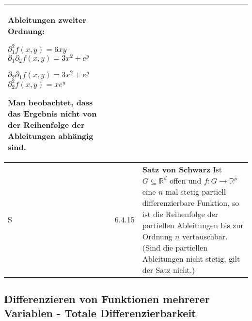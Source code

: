 \begin{longtable}{p{0.75cm} p{1cm} p{16cm}}
                        Ableitungen zweiter Ordnung: \hfill \break
                        \centerline{$\partial_1^2 f(x,y) =6xy$ \hspace{1cm} $\partial_1 \partial_2f(x,y) = 3x^2 + e^y $}
                        \centerline{$ \partial_2 \partial_1 f(x,y) = 3x^2 + e^y$ \hspace{1cm} $\partial_2^2f(x,y) = xe^y$} 
                        Man beobachtet, dass das Ergebnis nicht von der Reihenfolge der Ableitungen abhängig sind. \\
        \midrule
        S   & 6.4.15&   \textbf{Satz von Schwarz} \hfill \break
                        Ist $G \subseteq \mathbb{R}^d$ offen und $f: G \rightarrow \mathbb{R}^p$ eine $n$-mal stetig partiell differenzierbare Funktion,
                        so ist die Reihenfolge der partiellen Ableitungen bis zur Ordnung $n$ vertauschbar. \hfill \break
                        (Sind die partiellen Ableitungen nicht stetig, gilt der Satz nicht.)\\ 
        \bottomrule

    \end{longtable}

\pagebreak

\subsection{Differenzieren von Funktionen mehrerer Variablen - Totale Differenzierbarkeit}

